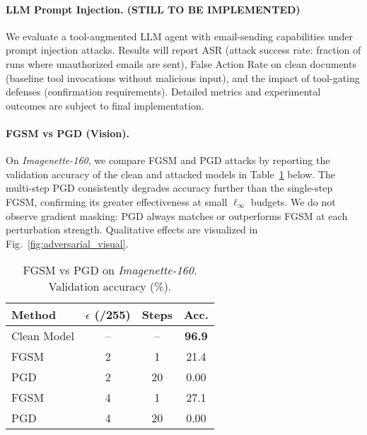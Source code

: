 \documentclass{article}
\begin{document}
\paragraph{LLM Prompt Injection. (STILL TO BE IMPLEMENTED)}

We evaluate a tool-augmented LLM agent with email-sending capabilities under prompt injection attacks. Results will report ASR (attack success rate: fraction of runs where unauthorized emails are sent), False Action Rate on clean documents (baseline tool invocations without malicious input), and the impact of tool-gating defenses (confirmation requirements). Detailed metrics and experimental outcomes are subject to final implementation.

\paragraph{FGSM vs PGD (Vision).}
On \textit{Imagenette-160}, we compare FGSM and PGD attacks by reporting the validation accuracy of the clean and attacked models in Table~\ref{tab:fgsm-pgd} below. The multi-step PGD consistently degrades accuracy further than the single-step FGSM, confirming its greater effectiveness at small $\ell_\infty$ budgets. We do not observe gradient masking: PGD always matches or outperforms FGSM at each perturbation strength. Qualitative effects are visualized in Fig.~\ref{fig:adversarial_visual}.

\begin{table}[H]
  \caption{FGSM vs PGD on \textit{Imagenette-160}. Validation accuracy (\%).}
  \label{tab:fgsm-pgd}
  \begin{center}
    \begin{small}
      \begin{tabular}{lccc}
        \toprule
        Method      & $\epsilon$ (/255) & Steps & Acc.           \\
        \midrule
        Clean Model & --                & --    & \textbf{96.9} \\
        FGSM        & 2                 & 1     & 21.4          \\
        PGD         & 2                 & 20    & 0.00           \\
        FGSM        & 4                 & 1     & 27.1          \\
        PGD         & 4                 & 20    & 0.00           \\
        \bottomrule
      \end{tabular}
    \end{small}
  \end{center}
  \vspace{-0.5cm}
\end{table}
\end{document}
